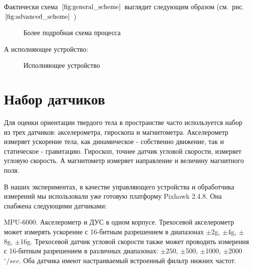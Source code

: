 \documentclass[12pt,a4paper]{article}
\begin{document}
Фактически схема~$\ref{fig:general_scheme}$ выглядит следующим образом (см.~рис.~$\ref{fig:advanced_scheme}$ )

\begin{figure}[h!]
	\caption{Более подробная схема процесса}
	\label{fig:advanced_scheme}
\end{figure}

А исполняющее устройство:

\begin{figure}[h!]
	\caption{Исполняющее устройство}
	\label{fig:isp_ustr}
\end{figure}

\section{Набор датчиков}

Для оценки ориентации твердого тела в пространстве часто используется набор из трех датчиков: акселерометра, гироскопа и магнитометра. Акселерометр измеряет ускорение тела, как динамическое - собственно движение, так и статическое - гравитацию. Гироскоп, точнее датчик угловой скорости, измеряет угловую скорость. А магнитометр измеряет направление и величину магнитного поля.

В наших экспериментах, в качестве управляющего устройства и обработчика измерений мы использовали уже готовую платформу Pixhawk 2.4.8. Она снабжена следующими датчиками:

MPU-6000. Акселерометр и ДУС в одном корпусе. Трехосевой акселерометр может измерять ускорение с 16-битным разрешением в диапазонах $\pm$2g, $\pm$4g, $\pm$8g, $\pm$16g. Трехосевой датчик угловой скорости также может проводить измерения с 16-битным разрешением в различных диапазонах: $\pm250$, $\pm$500, $\pm$1000, $\pm$2000 $^\circ /sec$. Оба датчика имеют настраиваемый встроенный фильтр нижних частот.
\end{document}
